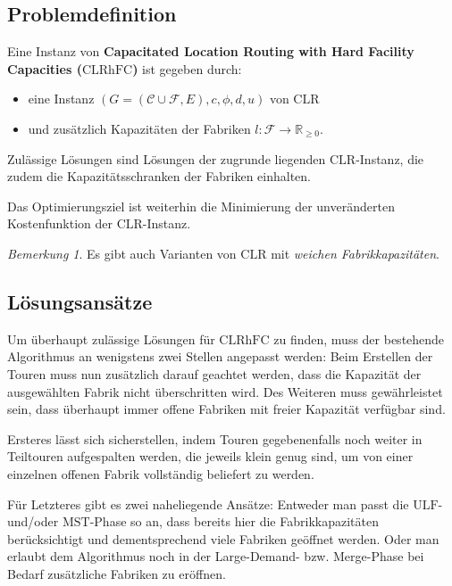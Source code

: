 \documentclass[a4paper,ngerman,11pt,bibtotoc]{scrartcl}
\theoremstyle{definition}
\theoremstyle{plain}
\theoremstyle{remark}
\newtheorem{bem}[defn]{Bemerkung}
\newcommand{\IR}{\mathbb{R}}
\newcommand{\ClientSet}{\mathscr{C}}
\newcommand{\FacilitySet}{\mathscr{F}}
\newcommand{\CLR}{\mathrm{CLR}}
\newcommand{\CLRHFC}{\mathrm{CLRhFC}}
\newcommand{\MST}{\mathrm{MST}}
\newcommand{\ULF}{\mathrm{ULF}}
\begin{document}
	\subsection{Problemdefinition}

Eine Instanz von \textbf{Capacitated Location Routing with Hard Facility Capacities ($\CLRHFC$)} ist gegeben durch:
\begin{itemize}
	\item eine Instanz $(G=(\ClientSet\cup\FacilitySet,E), c,\phi,d,u)$ von $\CLR$
	\item und zusätzlich Kapazitäten der Fabriken $l: \FacilitySet \to \IR_{\geq 0}$.
\end{itemize}
Zulässige Lösungen sind Lösungen der zugrunde liegenden $\CLR$-Instanz, die zudem die Kapazitätsschranken der Fabriken einhalten.

Das Optimierungsziel ist weiterhin die Minimierung der unveränderten Kostenfunktion der $\CLR$-Instanz.

\begin{bem}
Es gibt auch Varianten von $\CLR$ mit \emph{weichen Fabrikkapazitäten}. 

\end{bem}

	\subsection{Lösungsansätze}
	
	Um überhaupt zulässige Lösungen für $\CLRHFC$ zu finden, muss der bestehende Algorithmus an wenigstens zwei Stellen angepasst werden: Beim Erstellen der Touren muss nun zusätzlich darauf geachtet werden, dass die Kapazität der ausgewählten Fabrik nicht überschritten wird. Des Weiteren muss gewährleistet sein, dass überhaupt immer offene Fabriken mit freier Kapazität verfügbar sind.
	
	Ersteres lässt sich sicherstellen, indem Touren gegebenenfalls noch weiter in Teiltouren aufgespalten werden, die jeweils klein genug sind, um von einer einzelnen offenen Fabrik vollständig beliefert zu werden.
	
	Für Letzteres gibt es zwei naheliegende Ansätze: Entweder man passt die $\ULF$- und/oder $\MST$-Phase so an, dass bereits hier die Fabrikkapazitäten berücksichtigt und dementsprechend viele Fabriken geöffnet werden. Oder man erlaubt dem Algorithmus noch in der Large-Demand- bzw. Merge-Phase bei Bedarf zusätzliche Fabriken zu eröffnen. 
	
\end{document}
